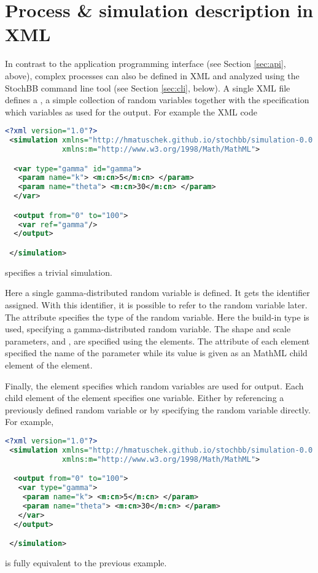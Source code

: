 \section{Process \& simulation description in XML} \label{sec:xml}
In contrast to the application programming interface (see Section \ref{sec:api}, above), 
complex processes can also be defined in XML and analyzed using the
StochBB command line tool (see Section \ref{sec:cli}, below). A single XML file defines a 
, a simple collection of random variables together with the specification which
variables as used for the output. For example the XML code
\begin{lstlisting}[language=XML]
 <?xml version="1.0"?>
 <simulation xmlns="http://hmatuschek.github.io/stochbb/simulation-0.0.dtd"
             xmlns:m="http://www.w3.org/1998/Math/MathML">

  <var type="gamma" id="gamma">
   <param name="k"> <m:cn>5</m:cn> </param>
   <param name="theta"> <m:cn>30</m:cn> </param>
  </var>

  <output from="0" to="100">
   <var ref="gamma"/>
  </output>

 </simulation>
\end{lstlisting}
specifies a trivial simulation.

Here a single gamma-distributed random variable is defined.
It gets the identifier  assigned. With this identifier, it is possible to refer to the random
variable later. The  attribute specifies the type of the random variable. Here the
build-in type  is used, specifying a gamma-distributed random variable. The shape and
scale parameters,  and , are specified using the  elements. 
The  attribute of each  element specified the name of the parameter while 
its value is given as an MathML child element of the  element.

Finally, the  element specifies which random variables are used for output. Each child
element of the  element specifies one variable. Either by referencing a previously defined
random variable or by specifying the random variable directly. For example,
\begin{lstlisting}[language=XML]
 <?xml version="1.0"?>
 <simulation xmlns="http://hmatuschek.github.io/stochbb/simulation-0.0.dtd"
             xmlns:m="http://www.w3.org/1998/Math/MathML">

  <output from="0" to="100">
   <var type="gamma">
    <param name="k"> <m:cn>5</m:cn> </param>
    <param name="theta"> <m:cn>30</m:cn> </param>
   </var>
  </output>

 </simulation>
\end{lstlisting}
is fully equivalent to the previous example.

